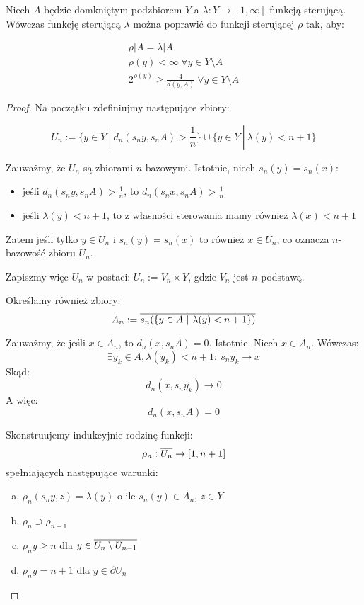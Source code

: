 \begin{thm}
\label{thm:steering-function}
Niech $A$ będzie domkniętym podzbiorem $Y$ a $\lambda: Y \rightarrow [1,\infty]$ funkcją sterującą. Wówczas funkcję sterującą $\lambda$ można poprawić do funkcji sterującej $\rho$ tak, aby:

\begin{gather}
 \rho|A = \lambda|A \\
 \rho(y) < \infty\ \forall y \in Y \setminus A \\
 2^{\rho(y)} \geq \frac{4}{d(y,A)}\ \forall y \in Y \setminus A
\end{gather}

\begin{proof}
  
  Na początku zdefiniujmy następujące zbiory:
  
  $$U_n := \{y \in Y\ |\ d_n(s_n y, s_n A) > \frac{1}{n}\} \cup \{y \in Y\ |\ \lambda(y) < n+1\}$$
  
  Zauważmy, że $U_n$ są zbiorami $n$-bazowymi. Istotnie, niech $s_n(y) = s_n(x)$:
  \begin{itemize}
    \item jeśli $d_n(s_n y, s_n A) > \frac{1}{n}$, to $d_n(s_n x, s_n A) > \frac{1}{n}$
    \item jeśli $\lambda(y) < n+1$, to z własności sterowania mamy również $\lambda(x) < n+1$
  \end{itemize}
  Zatem jeśli tylko $y \in U_n$ i $s_n(y) = s_n(x)$ to również $x \in U_n$, co oznacza $n$-bazowość zbioru $U_n$.
  
  Zapiszmy więc $U_n$ w postaci: $U_n := V_n \times Y$, gdzie $V_n$ jest $n$-podstawą.
  
  Określamy również zbiory:
  $$A_n := \overline{s_n({\{y \in A\ |\ \lambda(y) < n+1\}})}$$
  
  Zauważmy, że jeśli $x \in A_n$, to $d_n(x, s_n A) = 0$. Istotnie. Niech $x \in A_n$. Wówczas:
  $$\exists y_k \in A, \lambda(y_k) < n+1:\ s_n y_k \rightarrow x$$
  Skąd:
  $$d_n(x, s_n y_k) \rightarrow 0$$
  A więc:
  $$d_n(x, s_n A) = 0$$
  
  Skonstruujemy indukcyjnie rodzinę funkcji:
  $$\rho_n: \overline{U_n} \rightarrow [1, n+1]$$
  spełniających następujące warunki:
  \begin{enumerate}[(a)]
    \item \label{induction-1} $\rho_n(s_n y, z) = \lambda(y)$ o ile $s_n(y) \in A_n$, $z \in Y$
    \item \label{induction-2} $\rho_n \supset \rho_{n-1}$
    \item \label{induction-3} $\rho_n y \geq n$ dla $y \in \overline{U_n \setminus U_{n-1}}$
    \item \label{induction-4} $\rho_n y = n+1$ dla $y \in \partial U_n$
  \end{enumerate}
  

\end{proof}
\end{thm}
